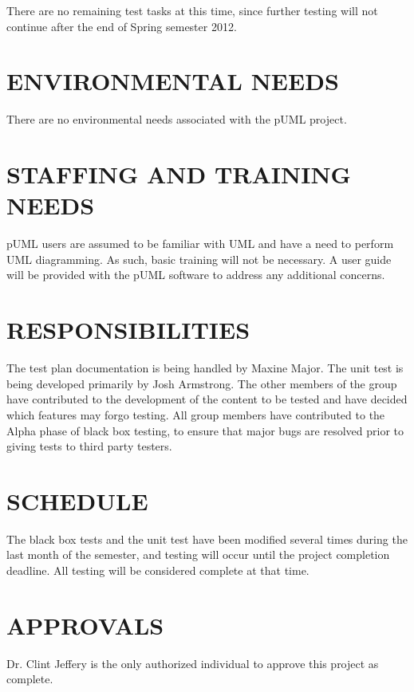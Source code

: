 \documentclass[twoside,letterpaper]{article}
\begin{document}
There are no remaining test tasks at this time, since further testing will not continue after the end of Spring semester 2012.

\section[ENVIRONMENTAL NEEDS]{\bfseries ENVIRONMENTAL NEEDS}

There are no environmental needs associated with the pUML project.


\section[STAFFING AND TRAINING NEEDS]
{\bfseries STAFFING AND TRAINING NEEDS}

pUML users are assumed to be familiar with UML and have a need to perform UML diagramming. As such, basic training will not be necessary.  A user guide will be provided with the pUML software to address any additional concerns. 


\section[RESPONSIBILITIES]{\bfseries RESPONSIBILITIES}

The test plan documentation is being handled by Maxine Major.
The unit test is being developed primarily by Josh Armstrong.
The other members of the group have contributed to the development of the content to be tested and have decided which features may forgo testing. All group members have contributed to the Alpha phase of black box testing, to ensure that major bugs are resolved prior to giving tests to third party testers.


\section[SCHEDULE]{\bfseries SCHEDULE}

The black box tests and the unit test have been modified several times during the last month of the semester, and testing will occur until the project completion deadline. All testing will be considered complete at that time.

\section[APPROVALS]{\bfseries APPROVALS}

Dr. Clint Jeffery is the only authorized individual to approve this project as complete.

\bigskip
\end{document}
